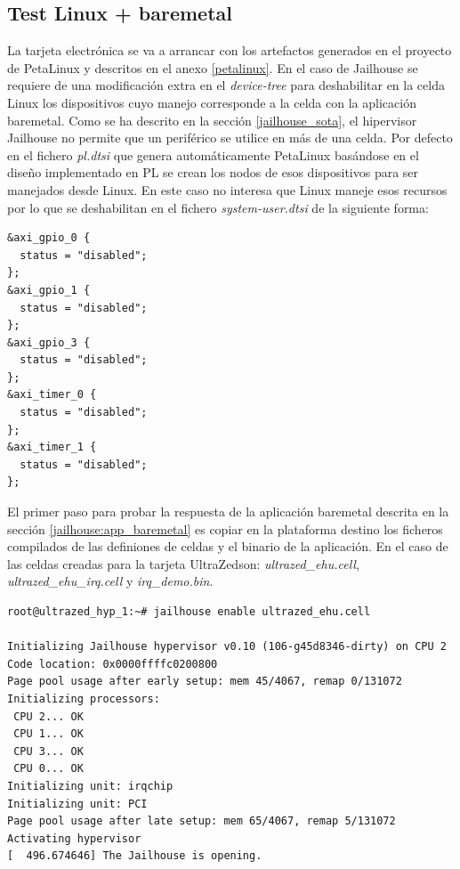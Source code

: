 \subsection{Test Linux + baremetal}

La tarjeta electrónica se va a arrancar con los artefactos generados en el proyecto de PetaLinux y descritos en el anexo \ref{petalinux}. En el caso de Jailhouse se requiere de una modificación extra en el \textit{device-tree} para deshabilitar en la celda Linux los dispositivos cuyo manejo corresponde a la celda con la aplicación baremetal. Como se ha descrito en la sección \ref{jailhouse_sota}, el hipervisor Jailhouse no permite que un periférico se utilice en más de una celda. Por defecto en el fichero \textit{pl.dtsi} que genera automáticamente PetaLinux basándose en el diseño implementado en \acrshort{PL} se crean los nodos de esos dispositivos para ser manejados desde Linux. En este caso no interesa que Linux maneje esos recursos por lo que se deshabilitan en el fichero \textit{system-user.dtsi} de la siguiente forma:
\begin{lstlisting}[style=CStyle]
&axi_gpio_0 {
  status = "disabled";
};
&axi_gpio_1 {
  status = "disabled";
};
&axi_gpio_3 {
  status = "disabled";
};
&axi_timer_0 {
  status = "disabled";
};
&axi_timer_1 {
  status = "disabled";
};
\end{lstlisting}

El primer paso para probar la respuesta de la aplicación baremetal descrita en la sección \ref{jailhouse:app_baremetal} es copiar en la plataforma destino los ficheros compilados de las definiones de celdas y el binario de la aplicación. En el caso de las celdas creadas para la tarjeta UltraZed\texttrademark son: \textit{ultrazed\_ehu.cell}, \textit{ultrazed\_ehu\_irq.cell} y \textit{irq\_demo.bin}.

\begin{lstlisting}[style=CStyle]
root@ultrazed_hyp_1:~# jailhouse enable ultrazed_ehu.cell

Initializing Jailhouse hypervisor v0.10 (106-g45d8346-dirty) on CPU 2
Code location: 0x0000ffffc0200800
Page pool usage after early setup: mem 45/4067, remap 0/131072
Initializing processors:
 CPU 2... OK
 CPU 1... OK
 CPU 3... OK
 CPU 0... OK
Initializing unit: irqchip
Initializing unit: PCI
Page pool usage after late setup: mem 65/4067, remap 5/131072
Activating hypervisor
[  496.674646] The Jailhouse is opening.
\end{lstlisting}

